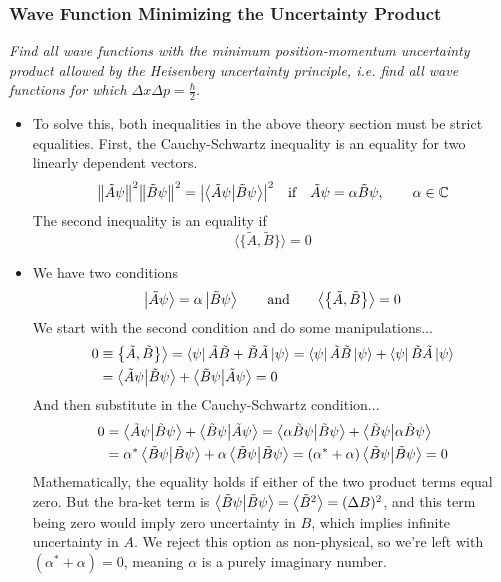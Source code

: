 \documentclass[11pt, a4paper]{article}
\newcommand{\eqtext}[1]{\qquad \text{#1} \qquad}
\begin{document}
\subsubsection{Wave Function Minimizing the Uncertainty Product}
\textit{Find all wave functions with the minimum position-momentum uncertainty product allowed by the Heisenberg uncertainty principle, i.e. find all wave functions for which $ \Delta x \Delta p = \frac{\hbar}{2} $}.
\begin{itemize}
	\item To solve this, both inequalities in the above theory section must be strict equalities. First, the Cauchy-Schwartz inequality is an equality for two linearly dependent vectors.
	\begin{equation*}
		\norm{\tilde{A}\psi}^{2}\norm{\tilde{B}\psi}^{2} = \abs{\braket{\tilde{A}\psi}{\tilde{B}\psi}}^{2} \quad \text{if} \quad \tilde{A}\psi = \alpha \tilde{B}\psi, \qquad \alpha \in \mathbb{C}
	\end{equation*}
	The second inequality is an equality if 
	\begin{equation*}
		\big\langle \big\{\tilde{A}, \tilde{B}\big\} \big\rangle = 0
	\end{equation*}
	
	\item We have two conditions
	\begin{equation*}
		\ket{\tilde{A}\psi} = \alpha \ket{\tilde{B}\psi} \eqtext{and} \big\langle \big\{\tilde{A}, \tilde{B}\big\} \big\rangle = 0
	\end{equation*}
	We start with the second condition and do some manipulations...
	\begin{align*}
		0 &\equiv \big\{\tilde{A}, \tilde{B}\big\} \big\rangle = \bra{\psi}\tilde{A}\tilde{B} + \tilde{B} \tilde{A} \ket{\psi} = \bra{\psi}\tilde{A}\tilde{B} \ket{\psi} + \bra{\psi}\tilde{B} \tilde{A} \ket{\psi}\\
		&= \braket{\tilde{A}\psi}{\tilde{B}\psi} + \braket{\tilde{B}\psi}{\tilde{A}\psi} = 0
	\end{align*}
	And then substitute in the Cauchy-Schwartz condition...
	\begin{align*}
		0 &= \braket{\tilde{A}\psi}{\tilde{B}\psi} + \braket{\tilde{B}\psi}{\tilde{A}\psi} = \braket{\alpha \tilde{B}\psi}{\tilde{B}\psi} + \braket{\tilde{B}\psi}{\alpha \tilde{B}\psi} \\
		& = \alpha^{*}\braket{ \tilde{B}\psi}{\tilde{B}\psi} + \alpha\braket{\tilde{B}\psi}{\tilde{B}\psi} = (\alpha^{*} + \alpha)\braket{\tilde{B}\psi}{\tilde{B}\psi} = 0
	\end{align*}
	Mathematically, the equality holds if either of the two product terms equal zero. But the bra-ket term is $ \braket{\tilde{B}\psi}{\tilde{B}\psi} = \big \langle \tilde{B}^{2} \big \rangle = (\Delta B)^{2}$, and this term being zero would imply zero uncertainty in $ B $, which implies infinite uncertainty in $ A $. We reject this option as non-physical, so we're left with $ (\alpha^{*} + \alpha) = 0 $, meaning $ \alpha $ is a purely imaginary number. 
	

\end{itemize}
\end{document}
